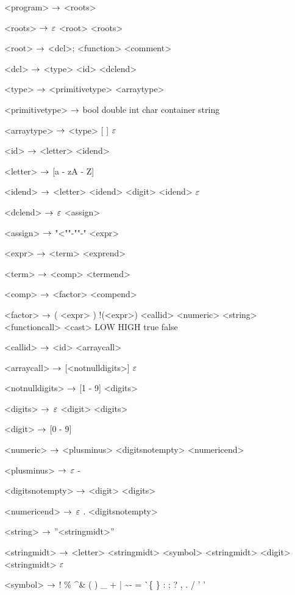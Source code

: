 \begin{grammar}
<program> $\rightarrow$ <roots>

<roots> $\rightarrow$ $\varepsilon$
\alt <root> <roots>

<root> $\rightarrow$ <dcl>;
\alt <function>
\alt <comment>

<dcl> $\rightarrow$ <type> <id> <dclend>

<type> $\rightarrow$ <primitivetype> <arraytype>

<primitivetype> $\rightarrow$ bool
\alt double
\alt int
\alt char
\alt container
\alt string

<arraytype> $\rightarrow$ <type> [ ]
\alt $\varepsilon$

<id> $\rightarrow$ <letter> <idend>

<letter> $\rightarrow$ [a - zA - Z]

<idend> $\rightarrow$ <letter> <idend>
	\alt <digit> <idend>
	\alt $\varepsilon$

<dclend> $\rightarrow$ $\varepsilon$
\alt <assign> 

<assign>  $\rightarrow$ "<""-""-" <expr>

<expr> $\rightarrow$ <term> <exprend>

<term> $\rightarrow$ <comp> <termend>

<comp> $\rightarrow$ <factor> <compend>

<factor> $\rightarrow$ ( <expr> )
	\alt !(<expr>)
	\alt <callid>
	\alt <numeric>
	\alt <string>
	\alt <functioncall> 
	\alt <cast>
	\alt LOW
	\alt HIGH
	\alt true
	\alt false

<callid> $\rightarrow$ <id> <arraycall>

<arraycall> $\rightarrow$ [<notnulldigits>]
\alt $\varepsilon$

<notnulldigits> $\rightarrow$ [1 - 9] <digits>

<digits> $\rightarrow$ $\varepsilon$
\alt <digit> <digits>

<digit> $\rightarrow$ [0 - 9]

<numeric> $\rightarrow$ <plusminus> <digitsnotempty> <numericend>

<plusminus> $\rightarrow$ $\varepsilon$
	\alt -

<digitsnotempty> $\rightarrow$ <digit> <digits>

<numericend> $\rightarrow$ $\varepsilon$
\alt . <digitsnotempty>

<string> $\rightarrow$ ''<stringmidt>''

<stringmidt> $\rightarrow$ <letter> <stringmidt>
\alt <symbol> <stringmidt>
\alt <digit> <stringmidt>
\alt $\varepsilon$

<symbol> $\rightarrow$ !
\alt \%
\alt \^
\alt \&
\alt (
\alt )
\alt \_
\alt +
\alt |
\alt \~
\alt -
\alt =
\alt \`
\alt \{
\alt \}
\alt [
\alt ]
\alt :
\alt ;
\alt ?
\alt ,
\alt .
\alt /
\alt ' '


\end{grammar}
